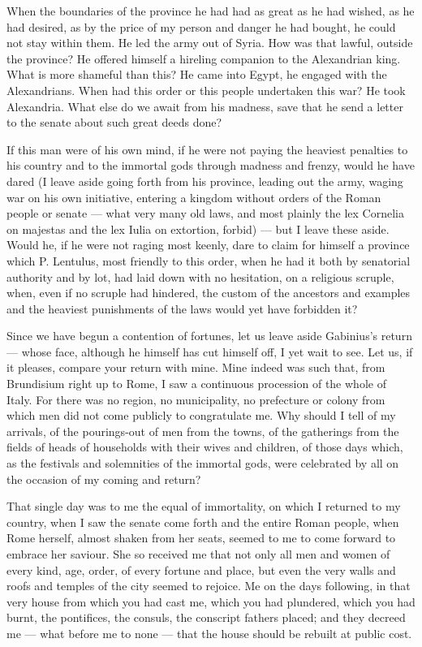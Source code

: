  When the boundaries of the province he had had as great as he had wished, as he had desired, as by the price of my person and danger he had bought, he could not stay within them. He led the army out of Syria. How was that lawful, outside the province? He offered himself a hireling companion to the Alexandrian king. What is more shameful than this? He came into Egypt, he engaged with the Alexandrians. When had this order or this people undertaken this war? He took Alexandria. What else do we await from his madness, save that he send a letter to the senate about such great deeds done?

 If this man were of his own mind, if he were not paying the heaviest penalties to his country and to the immortal gods through madness and frenzy, would he have dared (I leave aside going forth from his province, leading out the army, waging war on his own initiative, entering a kingdom without orders of the Roman people or senate — what very many old laws, and most plainly the lex Cornelia on majestas and the lex Iulia on extortion, forbid) — but I leave these aside. Would he, if he were not raging most keenly, dare to claim for himself a province which P. Lentulus, most friendly to this order, when he had it both by senatorial authority and by lot, had laid down with no hesitation, on a religious scruple, when, even if no scruple had hindered, the custom of the ancestors and examples and the heaviest punishments of the laws would yet have forbidden it?

 Since we have begun a contention of fortunes, let us leave aside Gabinius's return — whose face, although he himself has cut himself off, I yet wait to see. Let us, if it pleases, compare your return with mine. Mine indeed was such that, from Brundisium right up to Rome, I saw a continuous procession of the whole of Italy. For there was no region, no municipality, no prefecture or colony from which men did not come publicly to congratulate me. Why should I tell of my arrivals, of the pourings-out of men from the towns, of the gatherings from the fields of heads of households with their wives and children, of those days which, as the festivals and solemnities of the immortal gods, were celebrated by all on the occasion of my coming and return?

 That single day was to me the equal of immortality, on which I returned to my country, when I saw the senate come forth and the entire Roman people, when Rome herself, almost shaken from her seats, seemed to me to come forward to embrace her saviour. She so received me that not only all men and women of every kind, age, order, of every fortune and place, but even the very walls and roofs and temples of the city seemed to rejoice. Me on the days following, in that very house from which you had cast me, which you had plundered, which you had burnt, the pontifices, the consuls, the conscript fathers placed; and they decreed me — what before me to none — that the house should be rebuilt at public cost.


